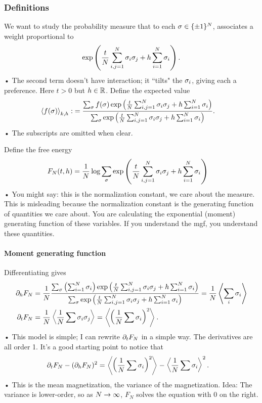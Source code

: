 \subsubsection{Definitions}

We want to study the probability measure that to each $\sigma\in \{\pm1\}^N$, associates a weight proportional to 
\begin{align*}
\exp\left( {\frac{t}{N} \sum_{i,j=1}^{N} \sigma_i\sigma_j + h\sum_{i=1}^{N} \sigma_i} \right).
\end{align*}•
The second term doesn't have interaction; it ``tilts" the $\sigma_i$, giving each a preference. Here $t>0$ but $h\in \mathbb{R}$.
Define the expected value
\begin{align*}
\left\langle {f(\sigma)}\right\rangle_{k,h} :&= \frac{\sum_\sigma f(\sigma) \exp\left( {\frac{t}{N} \sum_{i,j=1}^{N} \sigma_i\sigma_j + h\sum_{i=1}^{N} \sigma_i} \right)}{\sum_\sigma \exp\left( {\frac{t}{N} \sum_{i,j=1}^{N} \sigma_i\sigma_j + h\sum_{i=1}^{N} \sigma_i} \right)}.
\end{align*}•
The subscripts are omitted when clear.

Define the free energy
\begin{align*}
F_N(t,h) &=\frac{1}{N} \log \sum_\sigma \exp\left( {\frac{t}{N} \sum_{i,j=1}^{N} \sigma_i\sigma_j + h\sum_{i=1}^{N} \sigma_i} \right)
\end{align*}•
You might say: this is the normalization constant, we care about the measure. This is misleading because the normalization constant is the generating function of quantities we care about. You are calculating the exponential (moment) generating function of these variables. If you understand the mgf, you understand these quantities.

\paragraph{Moment generating function}
Differentiating gives
\begin{align}
\label{e:pd-h}
\partial_h F_N &= \frac{1}{N} \frac{\sum_\sigma \left( {\sum_{i=1}^{N} \sigma_i} \right) \exp\left( {\frac{t}{N} \sum_{i,j=1}^{N} \sigma_i\sigma_j + h\sum_{i=1}^{N} \sigma_i} \right)}{\sum_\sigma \exp\left( {\frac{t}{N} \sum_{i,j=1}^{N} \sigma_i\sigma_j + h\sum_{i=1}^{N} \sigma_i} \right)} = \frac{1}{N} \left\langle {\sum_i \sigma_i}\right\rangle\\
\partial_t F_N &= \frac{1}{N} \left\langle {\frac{1}{N}\sum \sigma_i\sigma_j}\right\rangle 
= \left\langle {\left( {\frac{1}{N} \sum \sigma_i} \right)^2}\right\rangle.
\end{align}•
This model is simple; I can rewrite $\partial_t F_N$ in a simple way. The derivatives are all order 1.
It's a good starting point to notice that
\begin{align*}
\partial_t  F_N - (\partial_hF_N)^2 &= 
\left\langle {\left( {\frac{1}{N} \sum \sigma_i} \right)^2}\right\rangle - \left\langle {\frac{1}{N} \sum \sigma_i}\right\rangle^2.
\end{align*}•
This is the mean magnetization, the variance of the magnetization.
Idea: The variance is lower-order, so as $N\to \infty$, $F_N$ solves the equation with 0 on the right.

